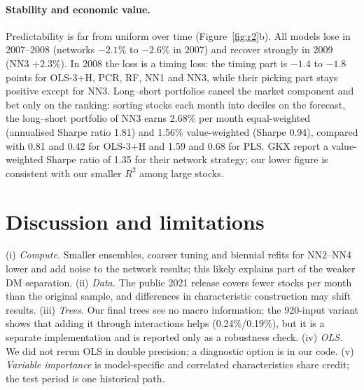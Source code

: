 \documentclass[10pt]{article}
\begin{document}
\paragraph{Stability and economic value.} Predictability is far from uniform over time (Figure~\ref{fig:r2}b). All models
lose in 2007--2008 (networks $-2.1\%$ to $-2.6\%$ in 2007) and recover strongly in 2009 (NN3 $+2.3\%$). In 2008 the loss is
a timing loss: the timing part is $-1.4$ to $-1.8$ points for OLS-3+H, PCR, RF, NN1 and NN3, while their picking part stays
positive except for NN3. Long--short portfolios cancel the market component and bet only on the ranking:
sorting stocks each month into deciles on the forecast, the long--short portfolio of NN3 earns 2.68\% per month
equal-weighted (annualised Sharpe ratio 1.81) and 1.56\% value-weighted (Sharpe 0.94), compared with 0.81 and 0.42 for
OLS-3+H and 1.59 and 0.68 for PLS. GKX report a value-weighted Sharpe ratio of 1.35 for their network strategy; our lower
figure is consistent with our smaller $R^2$ among large stocks.

\section{Discussion and limitations}
(i) \emph{Compute.} Smaller ensembles, coarser tuning and biennial refits for NN2--NN4 lower and add noise to the
network results; this likely explains part of the weaker DM separation. (ii) \emph{Data.} The public 2021 release covers
fewer stocks per month than the original sample, and differences in characteristic construction may shift results.
(iii) \emph{Trees.} Our final trees see no macro information; the 920-input variant shows that adding it through
interactions helps (0.24\%/0.19\%), but it is a separate implementation and is reported only as a robustness check.
(iv) \emph{OLS.} We did not rerun OLS in double precision; a diagnostic option is in our code. (v) \emph{Variable
importance} is model-specific and correlated characteristics share credit; the test period is one historical path.
\end{document}
